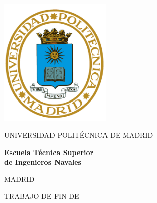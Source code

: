 
\begin{titlepage}
	\begin{center}
		\includegraphics[width=0.4\textwidth]{images/template/upm.png}
		
		
		\vspace{1pc}
		\Large{UNIVERSIDAD POLITÉCNICA DE MADRID}
		
		
		\vspace{1pc}
		\Large{ \bfseries{ Escuela Técnica Superior \\ de Ingenieros Navales}}
		
		
		\vspace{1pc}
		\large{MADRID}
		
		
		\vspace{1pc}
		\textsc{\large TRABAJO DE FIN DE \mydegree}
		
		
		\vspace{1.5pc}
		\Large{\mycode}
		
		
		\vspace{1.5pc}
		\Large{\mytitle}
	\end{center}
	

\end{titlepage}
